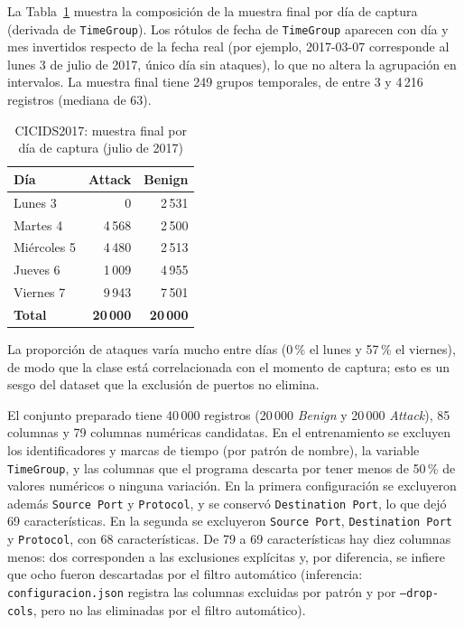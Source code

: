 \documentclass[conference]{IEEEtran}
\begin{document}
La Tabla~\ref{tab:dias} muestra la composición de la muestra final por día de captura (derivada de \texttt{TimeGroup}). Los rótulos de fecha de \texttt{TimeGroup} aparecen con día y mes invertidos respecto de la fecha real (por ejemplo, 2017-03-07 corresponde al lunes 3 de julio de 2017, único día sin ataques), lo que no altera la agrupación en intervalos. La muestra final tiene 249 grupos temporales, de entre 3 y 4\,216 registros (mediana de 63).

\begin{table}[!tb]
\centering
\footnotesize
\caption{CICIDS2017: muestra final por día de captura (julio de 2017)}
\label{tab:dias}
\begin{tabular}{lrr}
\toprule
\textbf{Día} & \textbf{Attack} & \textbf{Benign} \\
\midrule
Lunes 3 & 0 & 2\,531 \\
Martes 4 & 4\,568 & 2\,500 \\
Miércoles 5 & 4\,480 & 2\,513 \\
Jueves 6 & 1\,009 & 4\,955 \\
Viernes 7 & 9\,943 & 7\,501 \\
\midrule
\textbf{Total} & \textbf{20\,000} & \textbf{20\,000} \\
\bottomrule
\end{tabular}
\end{table}

La proporción de ataques varía mucho entre días (0\,\% el lunes y 57\,\% el viernes), de modo que la clase está correlacionada con el momento de captura; esto es un sesgo del dataset que la exclusión de puertos no elimina.

El conjunto preparado tiene 40\,000 registros (20\,000 \textit{Benign} y 20\,000 \textit{Attack}), 85 columnas y 79 columnas numéricas candidatas. En el entrenamiento se excluyen los identificadores y marcas de tiempo (por patrón de nombre), la variable \texttt{TimeGroup}, y las columnas que el programa descarta por tener menos de 50\,\% de valores numéricos o ninguna variación. En la primera configuración se excluyeron además \texttt{Source Port} y \texttt{Protocol}, y se conservó \texttt{Destination Port}, lo que dejó 69 características. En la segunda se excluyeron \texttt{Source Port}, \texttt{Destination Port} y \texttt{Protocol}, con 68 características. De 79 a 69 características hay diez columnas menos: dos corresponden a las exclusiones explícitas y, por diferencia, se infiere que ocho fueron descartadas por el filtro automático (inferencia: \texttt{configuracion.json} registra las columnas excluidas por patrón y por \texttt{--drop-cols}, pero no las eliminadas por el filtro automático).
\end{document}
